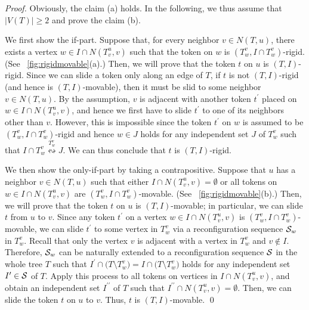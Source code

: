 \documentclass{llncs}
\newcommand{\msize}[1]{{\left|#1\right|}}
\newcommand{\Nei}[2]{N(#1,#2)}
\newcommand{\Tsub}[2]{T_{#1}^{#2}}
\newcommand{\bfI}{I}
\newcommand{\calS}{{\cal S}}
\newcommand{\sevstep}{\leftrightsquigarrow}
\newcommand{\sevstepT}[1]{\overset{#1}{\sevstep}}
\newcounter{one}
\begin{document}
	\begin{proof}
	Obviously, the claim (a) holds.
	In the following, we thus assume that $\msize{V(T)} \ge 2$ and prove the claim (b).

	We first show the if-part.
	Suppose that, for every neighbor $v \in \Nei{T}{u}$, there exists a vertex $w \in \bfI \cap \Nei{\Tsub{v}{u}}{v}$ such that the token on $w$ is $(\Tsub{w}{v}, \bfI \cap \Tsub{w}{v})$-rigid.
(See \figurename~\ref{fig:rigidmovable}(a).)
	Then, we will prove that the token $t$ on $u$ is $(T, \bfI)$-rigid. 
	Since we can slide a token only along an edge of $T$, if $t$ is not $(T, \bfI)$-rigid (and hence is $(T, \bfI)$-movable), then it must be slid to some neighbor $v \in \Nei{T}{u}$.
	By the assumption, $v$ is adjacent with another token $t^\prime$ placed on $w \in \bfI \cap \Nei{\Tsub{v}{u}}{v}$, and hence we first have to slide $t^\prime$ to one of its neighbors other than $v$.
	However, this is impossible since the token $t^\prime$ on $w$ is assumed to be $(\Tsub{w}{v}, \bfI \cap \Tsub{w}{v})$-rigid and hence $w \in J$ holds for any independent set $J$ of $\Tsub{w}{v}$ such that $\bfI \cap \Tsub{w}{v} \sevstepT{\Tsub{w}{v}} J$. 
	We can thus conclude that $t$ is $(T, \bfI)$-rigid. 

	We then show the only-if-part by taking a contrapositive. 
	Suppose that $u$ has a neighbor $v \in \Nei{T}{u}$ such that either $\bfI \cap \Nei{\Tsub{v}{u}}{v} = \emptyset$ or all tokens on $w \in \bfI \cap \Nei{\Tsub{v}{u}}{v}$ are $(\Tsub{w}{v}, \bfI \cap \Tsub{w}{v})$-movable.
(See \figurename~\ref{fig:rigidmovable}(b).)
	Then, we will prove that the token $t$ on $u$ is $(T, \bfI)$-movable;
in particular, we can slide $t$ from $u$ to $v$. 
	Since any token $t^\prime$ on a vertex $w \in \bfI \cap \Nei{\Tsub{v}{u}}{v}$ is $(\Tsub{w}{v}, \bfI \cap \Tsub{w}{v})$-movable, we can slide $t^\prime$ to some vertex in $\Tsub{w}{v}$ via a reconfiguration sequence $\calS_{w}$ in $\Tsub{w}{v}$. 
	Recall that only the vertex $v$ is adjacent with a vertex in $\Tsub{w}{v}$ and $v \not\in \bfI$.
	Therefore, $\calS_{w}$ can be naturally extended to a reconfiguration sequence $\calS$ in the whole tree $T$ such that $\bfI^\prime \cap \bigl( T \setminus \Tsub{w}{v} \bigr) = \bfI \cap \bigl( T \setminus \Tsub{w}{v} \bigr)$ holds for any independent set $\bfI^\prime \in \calS$ of $T$. 
	Apply this process to all tokens on vertices in $\bfI \cap \Nei{\Tsub{v}{u}}{v}$, and obtain an independent set $\bfI^{\prime \prime}$ of $T$ such that $\bfI^{\prime \prime} \cap \Nei{\Tsub{v}{u}}{v} = \emptyset$.
	Then, we can slide the token $t$ on $u$ to $v$. 
	Thus, $t$ is $(T, \bfI)$-movable. 
\qed
\end{proof}
\end{document}
